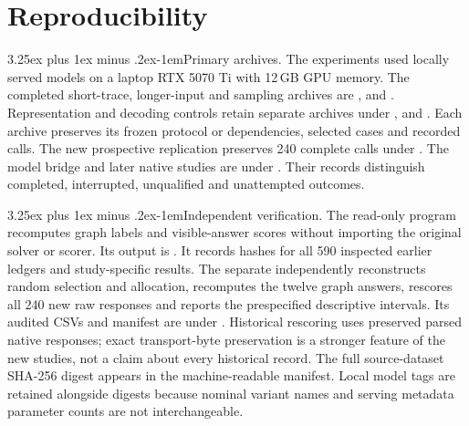 \documentclass[10pt]{article}
\makeatletter
\renewcommand\paragraph{\@startsection{paragraph}{4}{\parindent}%
  {3.25ex plus 1ex minus .2ex}{-1em}{\normalfont\normalsize\bfseries}}
\makeatother
\begin{document}




\appendix






\section{Reproducibility}
\paragraph{Primary archives.} The experiments used locally served models on a laptop RTX 5070 Ti with 12\,GB GPU memory. The completed short-trace, longer-input and sampling archives are \protect{}, \protect{} and \protect{}. Representation and decoding controls retain separate archives under \protect{}, \protect{} and \protect{}. Each archive preserves its frozen protocol or dependencies, selected cases and recorded calls. The new prospective replication preserves 240 complete calls under \protect{}. The model bridge and later native studies are under \protect{}. Their records distinguish completed, interrupted, unqualified and unattempted outcomes.

\paragraph{Independent verification.} The read-only program \protect{} recomputes graph labels and visible-answer scores without importing the original solver or scorer. Its output is \protect{}. It records hashes for all 590 inspected earlier ledgers and study-specific results. The separate \protect{} independently reconstructs random selection and allocation, recomputes the twelve graph answers, rescores all 240 new raw responses and reports the prespecified descriptive intervals. Its audited CSVs and manifest are under \protect{}. Historical rescoring uses preserved parsed native responses; exact transport-byte preservation is a stronger feature of the new studies, not a claim about every historical record. The full source-dataset SHA-256 digest appears in the machine-readable manifest. Local model tags are retained alongside digests because nominal variant names and serving metadata parameter counts are not interchangeable.
\end{document}
